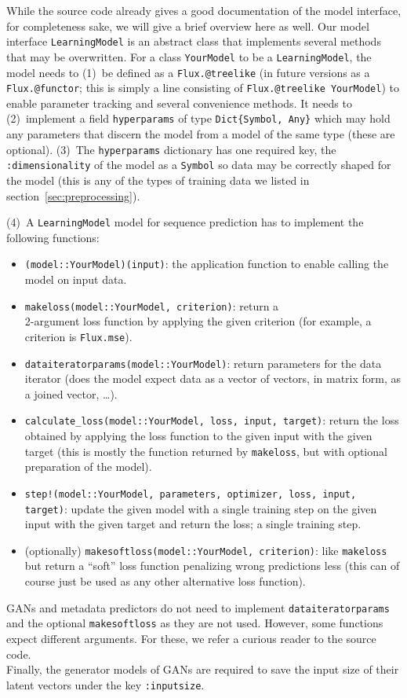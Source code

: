 While the source code already gives a good documentation of the model
interface, for completeness sake, we will give a brief overview here
as well. Our model interface \texttt{LearningModel} is an abstract
class that implements several methods that may be overwritten. For a
class \texttt{YourModel} to be a \texttt{LearningModel}, the model
needs to (1)~be defined as a \texttt{Flux.@treelike} (in future
versions as a \texttt{Flux.@functor}; this is simply a line consisting
of \texttt{Flux.@treelike YourModel}) to enable parameter tracking and
several convenience methods. It needs to (2)~implement a field
\texttt{hyperparams} of type \texttt{Dict\{Symbol, Any\}} which may
hold any parameters that discern the model from a model of the same
type (these are optional). (3)~The \texttt{hyperparams} dictionary has
one required key, the \texttt{:dimensionality} of the model as a
\texttt{Symbol} so data may be correctly shaped for the model (this is
any of the types of training data we listed in
section~\ref{sec:preprocessing}).

(4)~A \texttt{LearningModel} model for sequence prediction has to
implement the following functions:
\begin{itemize}
\item \texttt{(model::YourModel)(input)}: the application function to
  enable calling the model on input data.
\item \texttt{makeloss(model::YourModel, criterion)}: return a \\
  2-argument loss function by applying the given criterion (for
  example, a criterion is \texttt{Flux.mse}).
\item \texttt{dataiteratorparams(model::YourModel)}: return
  parameters for the data iterator (does the model expect data as a
  vector of vectors, in matrix form, as a joined vector, \dots).
\item \texttt{calculate\_loss(model::YourModel, loss, input, target)}:
  return the loss obtained by applying the loss function to the given
  input with the given target (this is mostly the function returned by
  \texttt{makeloss}, but with optional preparation of the model).
\item \texttt{step!(model::YourModel, parameters, optimizer, loss,
    input, target)}: update the given model with a single training
  step on the given input with the given target and return the loss; a
  single training step.
\item (optionally) \texttt{makesoftloss(model::YourModel, criterion)}:
  like \texttt{makeloss} but return a ``soft'' loss function
  penalizing wrong predictions less (this can of course just be used
  as any other alternative loss function).
\end{itemize}

GANs and metadata predictors do not need to implement
\texttt{dataiteratorparams} and the optional \texttt{makesoftloss} as
they are not used. However, some functions expect different arguments.
For these, we refer a curious reader to the source code. \\
Finally, the generator models of GANs are required to save the input
size of their latent vectors under the key \texttt{:inputsize}.

